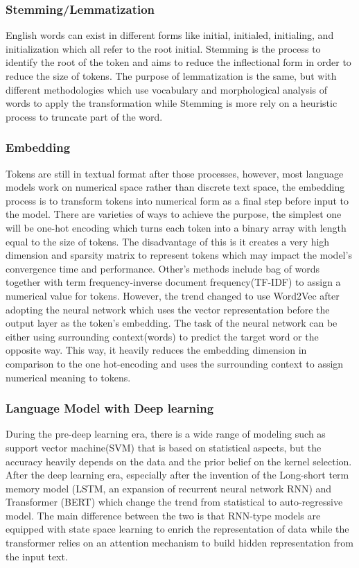 \documentclass[12pt]{article}
\begin{document}
\subsubsection{Stemming/Lemmatization}
English words can exist in different forms like initial, initialed, initialing, and initialization which all refer to the root initial. Stemming is the process to identify the root of the token and aims to reduce the inflectional form in order to reduce  the size of tokens. The purpose of lemmatization is the same, but with different methodologies which use vocabulary and morphological analysis of words to apply the transformation while Stemming is more rely on a heuristic process to truncate part of the word.

\subsubsection{Embedding}
Tokens are still in textual format after those processes, however, most language models work on numerical space rather than discrete text space, the embedding process is to transform tokens into numerical form as a final step before input to the model. There are varieties of ways to achieve the purpose, the simplest one will be one-hot encoding which turns each token into a binary array with length equal to the size of tokens. The disadvantage of this is it creates a very high dimension and  sparsity matrix to represent tokens which may impact the model's convergence time and performance. Other's methods include bag of words together with term frequency-inverse document frequency(TF-IDF) to assign a numerical value for tokens. However, the trend changed to use Word2Vec after adopting the neural network which uses the vector representation before the output layer as the token's embedding. The task of the neural network can be either using surrounding context(words) to predict the target word or the opposite way. This way, it heavily reduces the embedding dimension in comparison to the one hot-encoding and uses the surrounding context to assign numerical meaning to tokens.\\

\subsubsection{Language Model with Deep learning}
During the pre-deep learning era, there is a wide range of modeling such as support vector machine(SVM) that is based on statistical aspects, but the accuracy heavily depends on the data and the prior belief on the kernel selection. After the deep learning era, especially after the invention of the Long-short term memory model (LSTM, an expansion of recurrent neural network RNN) and Transformer (BERT) which change the trend from statistical to auto-regressive model.  The main difference between the two is that RNN-type models are equipped with state space learning\cite{Siegelmann_1995} to enrich the representation of data while the transformer relies on an attention mechanism to build hidden representation from the input text.\\
\end{document}
